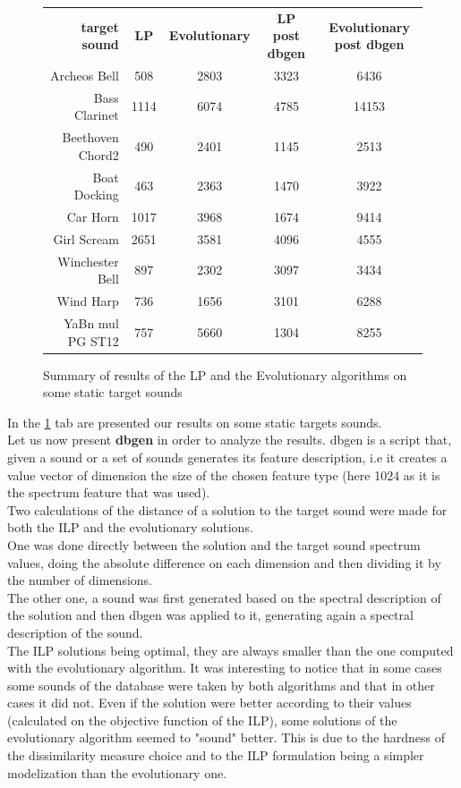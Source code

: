 \documentclass[a4paper]{book}
\begin{document}
\begin{figure}[ht!]
\begin{tabular}{r||c|c|c|c}%
     \textbf{target sound}&\textbf{LP}&\textbf{Evolutionary}&\textbf{LP post dbgen}&\textbf{Evolutionary post dbgen}  \\
     Archeos Bell&508&2803&3323&6436\\
Bass Clarinet&1114&6074&4785&14153\\
Beethoven Chord2&490&2401&1145&2513\\
Boat Docking&463&2363&1470&3922\\
Car Horn&1017&3968&1674&9414\\
Girl Scream&2651&3581&4096&4555\\
Winchester Bell&897&2302&3097&3434\\
Wind Harp&736&1656&3101&6288\\
YaBn mul PG ST12&757&5660&1304&8255\\	
 
\end{tabular}
\caption{Summary of results of the LP and the Evolutionary algorithms on some static target sounds }
\label{tab:resultstat}
\end{figure}
In the \ref{tab:resultstat} tab are presented our results on some static targets sounds. \\ 
Let us now present \textbf{dbgen} in order to analyze the results. dbgen is a script that, given a sound or a set of sounds generates its feature description, i.e it creates a value vector of dimension the size of the chosen feature type (here 1024 as it is the spectrum feature that was used). \\
Two calculations of the distance of a solution to the target sound were made for both the ILP and the evolutionary solutions. \\
One was done directly between the solution and the target sound spectrum values, doing the absolute difference on each dimension and then dividing it by the number of dimensions. \\
The other one, a sound was first generated based on the spectral description of the solution and then dbgen was applied to it, generating again a spectral description of the sound. \\

 The ILP solutions being optimal, they are always smaller than the one computed with the evolutionary algorithm. It was interesting to notice that in some cases some sounds of the database were taken by both algorithms and that in other cases it did not. Even  if the solution were better according to their values (calculated on the objective function of the ILP), some solutions of the evolutionary algorithm seemed to "sound" better. This is due to the hardness of the dissimilarity measure choice and to the ILP formulation being a simpler modelization than the evolutionary one. 
 
\end{document}
